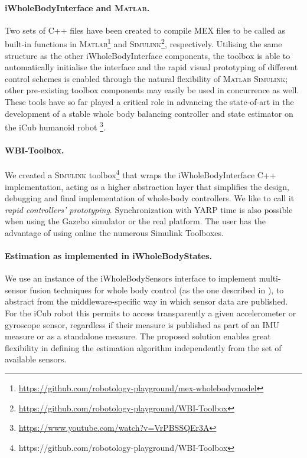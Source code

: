 \documentclass[11pt]{article}
\newcommand\textvtt[1]{{\normalfont\fontfamily{cmvtt}\selectfont #1}}
\begin{document}
\paragraph{\textvtt{iWholeBodyInterface} and \textsc{Matlab}.}

Two sets of C++ files have been created to compile {MEX} files to be called as built-in functions in \textsc{Matlab}\footnote{\protect\url{https://github.com/robotology-playground/mex-wholebodymodel}} and \textsc{Simulink}\footnote{\protect\url{https://github.com/robotology-playground/WBI-Toolbox}}, respectively. Utilising the same structure as the other \textvtt{iWholeBodyInterface} components, the toolbox is able to automatically initialise the interface and the rapid visual prototyping of different control schemes is enabled through the natural flexibility of \textsc{Matlab} \textsc{Simulink}; other pre-existing toolbox components may easily be used in concurrence as well. These tools have so far played a critical role in advancing the state-of-art in the development of a stable whole body balancing controller and state estimator on the iCub humanoid robot \footnote{\protect\url{https://www.youtube.com/watch?v=VrPBSSQEr3A}}.

\paragraph{WBI-Toolbox.}
We created a \textsc{Simulink} toolbox\footnote{https://github.com/robotology-playground/WBI-Toolbox} that wraps the \textvtt{iWholeBodyInterface} C++ implementation, acting as a higher abstraction layer that simplifies the design, debugging and final implementation of whole-body controllers. We like to call it \emph{rapid controllers' prototyping}. Synchronization with YARP time is also possible when using the Gazebo simulator or the real platform. The user has the advantage of using online the numerous Simulink Toolboxes. 

\paragraph{Estimation as implemented in \textvtt{iWholeBodyStates}.}
We use an instance of the \textvtt{iWholeBodySensors} interface to implement multi-sensor fusion techniques for whole body control (as the one described in \cite{nori15}), to abstract from the middleware-specific way in which sensor data are published. For the iCub robot this permits to access transparently a given accelerometer or gyroscope sensor, regardless if their measure is published as part of an IMU measure or as a standalone measure. The proposed solution enables great flexibility in defining the estimation algorithm independently from the set of available sensors.
\end{document}
